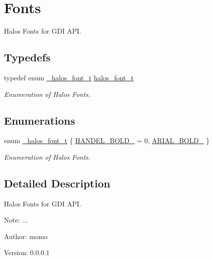 \hypertarget{group__hgdi__fonts}{
\section{Fonts}
\label{group__hgdi__fonts}
}
Halos Fonts for GDI API.  


\subsection*{Typedefs}
\begin{CompactItemize}
\item 
\hypertarget{group__hgdi__fonts_gec86a33a52fa97333da1074389df46a3}{
typedef enum \hyperlink{group__hgdi__fonts_g00f868edeb5f757b072d265ae951ab3a}{\_\-halos\_\-font\_\-t} \hyperlink{group__hgdi__fonts_gec86a33a52fa97333da1074389df46a3}{halos\_\-font\_\-t}}
\label{group__hgdi__fonts_gec86a33a52fa97333da1074389df46a3}

\begin{CompactList}\small\item\em Enumeration of Halos Fonts. \item\end{CompactList}\end{CompactItemize}
\subsection*{Enumerations}
\begin{CompactItemize}
\item 
enum \hyperlink{group__hgdi__fonts_g00f868edeb5f757b072d265ae951ab3a}{\_\-halos\_\-font\_\-t} \{ \hyperlink{group__hgdi__fonts_gg00f868edeb5f757b072d265ae951ab3a885578c504898ecc5c89f1ebdd265f79}{HANDEL\_\-BOLD\_} =  0, 
\hyperlink{group__hgdi__fonts_gg00f868edeb5f757b072d265ae951ab3a06baaacffbceaa684aac2bad0bc97c1a}{ARIAL\_\-BOLD\_}
 \}
\begin{CompactList}\small\item\em Enumeration of Halos Fonts. \item\end{CompactList}\end{CompactItemize}


\subsection{Detailed Description}
Halos Fonts for GDI API. 

\begin{Desc}
\item[Note:]... \end{Desc}
\begin{Desc}
\item[Author:]momo \end{Desc}
\begin{Desc}
\item[Version:]0.0.0.1 \end{Desc}


